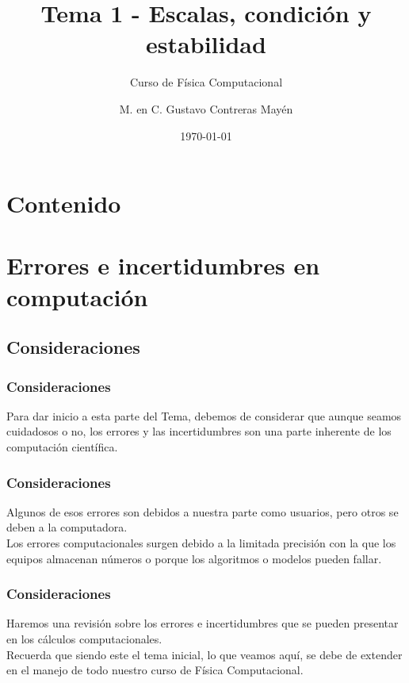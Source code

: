 



\title{\large{Tema 1 - Escalas, condición y estabilidad}}
\subtitle{Curso de Física Computacional}
\author[]{M. en C. Gustavo Contreras Mayén}
\date{\today}

\maketitle
\section*{Contenido}
\fontsize{14}{14}\selectfont
{}
\section{Errores e incertidumbres en computación}
\subsection{Consideraciones}
\begin{frame}
\frametitle{Consideraciones}
Para dar inicio a esta parte del Tema, debemos de considerar que aunque seamos cuidadosos o no, los errores y las incertidumbres son una parte inherente de los computación científica.
\end{frame}
\begin{frame}
\frametitle{Consideraciones}
Algunos de esos errores son debidos a nuestra parte como usuarios, pero otros se deben a la computadora.
\\
\bigskip
Los errores computacionales surgen debido a la limitada precisión con la que los equipos almacenan números o porque los algoritmos o modelos pueden fallar.
\end{frame}
\begin{frame}
\frametitle{Consideraciones}
Haremos una revisión sobre los errores e incertidumbres que se pueden presentar en los cálculos computacionales.
\\
\bigskip
\pause
Recuerda que siendo este el tema inicial, lo que veamos aquí, se debe de extender en el manejo de todo nuestro curso de Física Computacional.
\end{frame}
